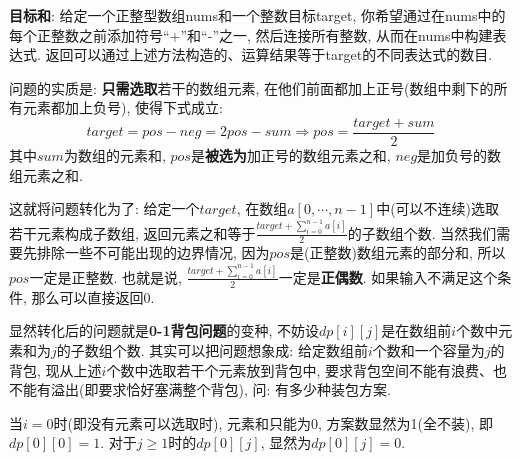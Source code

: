 \documentclass{article}
\begin{document}
\pagebreak

\begin{homeworkProblem}
	\textbf{目标和}: 给定一个正整型数组nums和一个整数目标target, 你希望通过在nums中的每个正整数之前添加符号“+”和“-”之一, 然后连接所有整数, 从而在nums中构建表达式. 返回可以通过上述方法构造的、运算结果等于target的不同表达式的数目.
	
	\solution 问题的实质是: \textbf{只需选取}若干的数组元素, 在他们前面都加上正号(数组中剩下的所有元素都加上负号), 使得下式成立:
	$$
	target=pos-neg=2pos-sum\Rightarrow pos=\frac{target+sum}{2}
	$$
	其中$sum$为数组的元素和, $pos$是\textbf{被选为}加正号的数组元素之和, $neg$是加负号的数组元素之和.

	这就将问题转化为了: 给定一个$target$, 在数组$a[0,\cdots, n - 1]$中(可以不连续)选取若干元素构成子数组, 返回元素之和等于$\displaystyle \frac{target+\sum_{i=0}^{n-1}{a\left[ i \right]}}{2}$的子数组个数. 当然我们需要先排除一些不可能出现的边界情况, 因为$pos$是(正整数)数组元素的部分和, 所以$pos$一定是正整数. 也就是说, $\displaystyle \frac{target+\sum_{i=0}^{n-1}{a\left[ i \right]}}{2}$一定是\textbf{正偶数}. 如果输入不满足这个条件, 那么可以直接返回0. 
	
	显然转化后的问题就是\textbf{0-1背包问题}的变种, 不妨设$dp\left[ i \right] \left[ j \right]$是在数组前$i$个数中元素和为$j$的子数组个数. 其实可以把问题想象成: 给定数组前$i$个数和一个容量为$j$的背包, 现从上述$i$个数中选取若干个元素放到背包中, 要求背包空间不能有浪费、也不能有溢出(即要求恰好塞满整个背包), 问: 有多少种装包方案. 

	当$i=0$时(即没有元素可以选取时), 元素和只能为0, 方案数显然为1(全不装), 即$dp[0][0]=1$. 对于$j\geq 1$时的$dp[0][j]$, 显然为$dp\left[ 0 \right] \left[ j \right] =0$.


\end{homeworkProblem}
\end{document}
